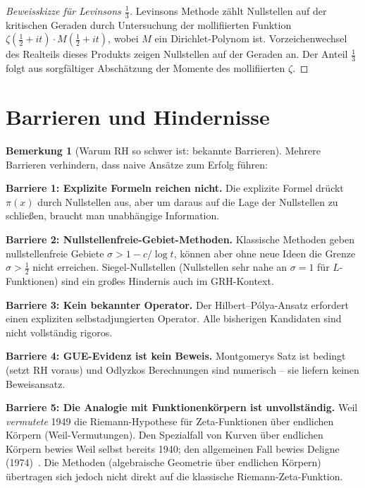 \documentclass[12pt,a4paper]{amsart}
\theoremstyle{definition}
\newtheorem{remark}[theorem]{Bemerkung}
\begin{document}
\begin{proof}[Beweisskizze f\"ur Levinsons $\tfrac{1}{3}$]
Levinsons Methode z\"ahlt Nullstellen auf der kritischen Geraden
durch Untersuchung der \glqq mollifiierten\grqq{} Funktion
$\zeta(\tfrac{1}{2}+it) \cdot M(\tfrac{1}{2}+it)$,
wobei $M$ ein Dirichlet-Polynom ist.
Vorzeichenwechsel des Realteils dieses Produkts zeigen Nullstellen auf
der Geraden an.
Der Anteil $\tfrac{1}{3}$ folgt aus sorgf\"altiger Absch\"atzung der
Momente des mollifiierten $\zeta$.
\end{proof}

\section{Barrieren und Hindernisse}

\begin{remark}[Warum RH so schwer ist: bekannte Barrieren]
Mehrere Barrieren verhindern, dass naive Ans\"atze zum Erfolg f\"uhren:

\textbf{Barriere 1: Explizite Formeln reichen nicht.}
Die explizite Formel dr\"uckt $\pi(x)$ durch Nullstellen aus, aber um
daraus auf die Lage der Nullstellen zu schlie\ss en, braucht man
unabh\"angige Information.

\textbf{Barriere 2: Nullstellenfreie-Gebiet-Methoden.}
Klassische Methoden geben nullstellenfreie Gebiete $\sigma > 1 - c/\log t$,
k\"onnen aber ohne neue Ideen die Grenze $\sigma > \tfrac{1}{2}$ nicht
erreichen.
Siegel-Nullstellen (Nullstellen sehr nahe an $\sigma = 1$ f\"ur
$L$-Funktionen) sind ein gro\ss es Hindernis auch im GRH-Kontext.

\textbf{Barriere 3: Kein bekannter Operator.}
Der Hilbert--P\'olya-Ansatz erfordert einen expliziten selbstadjungierten
Operator. Alle bisherigen Kandidaten sind nicht vollst\"andig rigoros.

\textbf{Barriere 4: GUE-Evidenz ist kein Beweis.}
Montgomerys Satz ist bedingt (setzt RH voraus) und Odlyzkos Berechnungen
sind numerisch -- sie liefern keinen Beweisansatz.

\textbf{Barriere 5: Die Analogie mit Funktionenk\"orpern ist unvollst\"andig.}
Weil \emph{vermutete} 1949 die Riemann-Hypothese f\"ur Zeta-Funktionen
\"uber endlichen K\"orpern (Weil-Vermutungen). Den Spezialfall von Kurven
\"uber endlichen K\"orpern bewies Weil selbst bereits 1940; den allgemeinen
Fall bewies Deligne (1974)~\cite{Deligne1974}.
Die Methoden (algebraische Geometrie \"uber endlichen K\"orpern)
\"ubertragen sich jedoch nicht direkt auf die klassische Riemann-Zeta-Funktion.
\end{remark}
\end{document}
